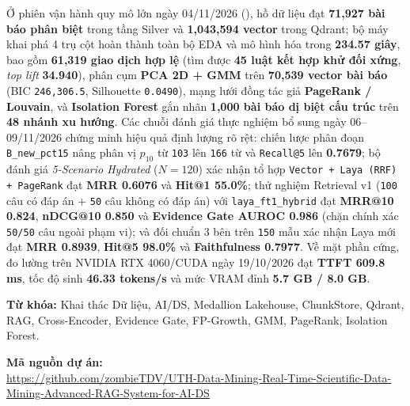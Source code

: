 Ở phiên vận hành quy mô lớn ngày 04/11/2026 (), hồ dữ liệu đạt \textbf{71,927 bài báo phân biệt} trong tầng Silver và \textbf{1,043,594 vector} trong Qdrant; bộ máy khai phá 4 trụ cột hoàn thành toàn bộ EDA và mô hình hóa trong \textbf{234.57 giây}, bao gồm \textbf{61,319 giao dịch hợp lệ} (tìm được \textbf{45 luật kết hợp khử đối xứng}, \textit{top lift} \textbf{34.940}), phân cụm \textbf{PCA 2D + GMM} trên \textbf{70,539 vector bài báo} (BIC \texttt{246,306.5}, Silhouette \texttt{0.0490}), mạng lưới đồng tác giả \textbf{PageRank / Louvain}, và \textbf{Isolation Forest} gắn nhãn \textbf{1,000 bài báo dị biệt cấu trúc} trên \textbf{48 nhánh xu hướng}. Các chuỗi đánh giá thực nghiệm bổ sung ngày 06--09/11/2026 chứng minh hiệu quả định lượng rõ rệt: chiến lược phân đoạn \texttt{B\_new\_pct15} nâng phân vị $p_{10}$ từ \texttt{103} lên \texttt{166} từ và \texttt{Recall@5} lên \textbf{0.7679}; bộ đánh giá \textit{5-Scenario Hydrated} ($N=120$) xác nhận tổ hợp \texttt{Vector + Laya (RRF) + PageRank} đạt \textbf{MRR 0.6076} và \textbf{Hit@1 55.0\%}; thử nghiệm Retrieval v1 (\texttt{100} câu có đáp án + \texttt{50} câu không có đáp án) với \texttt{laya\_ft1\_hybrid} đạt \textbf{MRR@10 0.824}, \textbf{nDCG@10 0.850} và \textbf{Evidence Gate AUROC 0.986} (chặn chính xác \texttt{50/50} câu ngoài phạm vi); và đối chuẩn 3 bên trên \texttt{150} mẫu xác nhận Laya mới đạt \textbf{MRR 0.8939}, \textbf{Hit@5 98.0\%} và \textbf{Faithfulness 0.7977}. Về mặt phần cứng, đo lường trên NVIDIA RTX 4060/CUDA ngày 19/10/2026 đạt \textbf{TTFT 609.8 ms}, tốc độ sinh \textbf{46.33 tokens/s} và mức VRAM đỉnh \textbf{5.7 GB / 8.0 GB}.

\noindent\textbf{Từ khóa:} Khai thác Dữ liệu, AI/DS, Medallion Lakehouse, ChunkStore, Qdrant, RAG, Cross-Encoder, Evidence Gate, FP-Growth, GMM, PageRank, Isolation Forest.

\noindent\textbf{Mã nguồn dự án:}\\
\url{https://github.com/zombieTDV/UTH-Data-Mining-Real-Time-Scientific-Data-Mining-Advanced-RAG-System-for-AI-DS}
